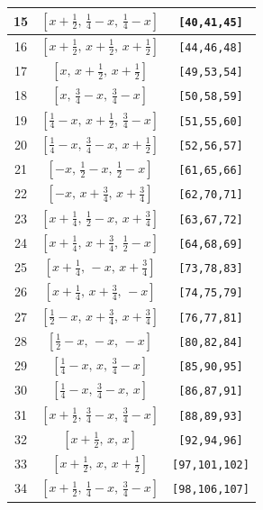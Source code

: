 \documentclass[fleqn,8pt]{jsarticle}
\begin{document}
\begin{longtable}{ccc}
15 & $\left[ x + \frac{1}{2},\, \frac{1}{4} - x,\, \frac{1}{4} - x \right]$ & {\tt [40,41,45]} \\ \hline
16 & $\left[ x + \frac{1}{2},\, x + \frac{1}{2},\, x + \frac{1}{2} \right]$ & {\tt [44,46,48]} \\ \hline
17 & $\left[ x,\, x + \frac{1}{2},\, x + \frac{1}{2} \right]$ & {\tt [49,53,54]} \\ \hline
18 & $\left[ x,\, \frac{3}{4} - x,\, \frac{3}{4} - x \right]$ & {\tt [50,58,59]} \\ \hline
19 & $\left[ \frac{1}{4} - x,\, x + \frac{1}{2},\, \frac{3}{4} - x \right]$ & {\tt [51,55,60]} \\ \hline
20 & $\left[ \frac{1}{4} - x,\, \frac{3}{4} - x,\, x + \frac{1}{2} \right]$ & {\tt [52,56,57]} \\ \hline
21 & $\left[ - x,\, \frac{1}{2} - x,\, \frac{1}{2} - x \right]$ & {\tt [61,65,66]} \\ \hline
22 & $\left[ - x,\, x + \frac{3}{4},\, x + \frac{3}{4} \right]$ & {\tt [62,70,71]} \\ \hline
23 & $\left[ x + \frac{1}{4},\, \frac{1}{2} - x,\, x + \frac{3}{4} \right]$ & {\tt [63,67,72]} \\ \hline
24 & $\left[ x + \frac{1}{4},\, x + \frac{3}{4},\, \frac{1}{2} - x \right]$ & {\tt [64,68,69]} \\ \hline
25 & $\left[ x + \frac{1}{4},\, - x,\, x + \frac{3}{4} \right]$ & {\tt [73,78,83]} \\ \hline
26 & $\left[ x + \frac{1}{4},\, x + \frac{3}{4},\, - x \right]$ & {\tt [74,75,79]} \\ \hline
27 & $\left[ \frac{1}{2} - x,\, x + \frac{3}{4},\, x + \frac{3}{4} \right]$ & {\tt [76,77,81]} \\ \hline
28 & $\left[ \frac{1}{2} - x,\, - x,\, - x \right]$ & {\tt [80,82,84]} \\ \hline
29 & $\left[ \frac{1}{4} - x,\, x,\, \frac{3}{4} - x \right]$ & {\tt [85,90,95]} \\ \hline
30 & $\left[ \frac{1}{4} - x,\, \frac{3}{4} - x,\, x \right]$ & {\tt [86,87,91]} \\ \hline
31 & $\left[ x + \frac{1}{2},\, \frac{3}{4} - x,\, \frac{3}{4} - x \right]$ & {\tt [88,89,93]} \\ \hline
32 & $\left[ x + \frac{1}{2},\, x,\, x \right]$ & {\tt [92,94,96]} \\ \hline
33 & $\left[ x + \frac{1}{2},\, x,\, x + \frac{1}{2} \right]$ & {\tt [97,101,102]} \\ \hline
34 & $\left[ x + \frac{1}{2},\, \frac{1}{4} - x,\, \frac{3}{4} - x \right]$ & {\tt [98,106,107]} \\ \hline

\end{longtable}
\end{document}
